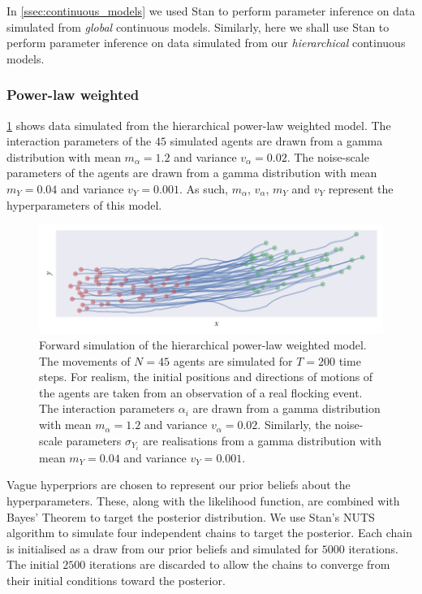 In \cref{ssec:continuous_models} we used Stan to perform parameter inference on
data simulated from \emph{global} continuous models. Similarly, here we shall
use Stan to perform parameter inference on data simulated from our
\emph{hierarchical} continuous models.

\subsubsection{Power-law weighted}

\cref{fig:power_hier_sim} shows data simulated from the hierarchical power-law
weighted model. The interaction parameters of the $45$ simulated agents are
drawn from a gamma distribution with mean $m_{\alpha}=1.2$ and variance
$v_{\alpha}=0.02$. The noise-scale parameters of the agents are drawn from a
gamma distribution with mean $m_Y=0.04$ and variance $v_Y=0.001$. As such,
$m_{\alpha}$, $v_{\alpha}$, $m_Y$ and $v_Y$ represent the hyperparameters of
this model.

\begin{figure}[tbp]
  \includegraphics{power_hier_sim.pdf}
  \caption{Forward simulation of the hierarchical power-law weighted model. The
    movements of $N=45$ agents are simulated for $T=200$ time steps. For
    realism, the initial positions and directions of motions of the agents
    are taken from an observation of a real flocking event. The interaction
    parameters $\alpha_i$ are drawn from a gamma distribution with mean
    $m_{\alpha}=1.2$ and variance $v_{\alpha}=0.02$. Similarly, the
    noise-scale parameters $\sigma_{Y_i}$ are realisations from a gamma
    distribution with mean $m_Y=0.04$ and variance $v_Y=0.001$.}
  \label{fig:power_hier_sim}
\end{figure}

Vague hyperpriors are chosen to represent our prior beliefs about the
hyperparameters. These, along with the likelihood function, are combined with
Bayes' Theorem to target the posterior distribution. We use Stan's NUTS
algorithm to simulate four independent chains to target the posterior. Each
chain is initialised as a draw from our prior beliefs and simulated for $5000$
iterations. The initial $2500$ iterations are discarded to allow the chains to
converge from their initial conditions toward the posterior.

